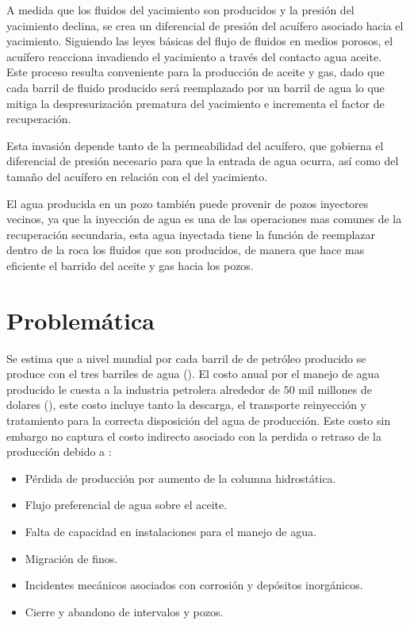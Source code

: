 A medida que los fluidos del yacimiento son producidos y la presión del yacimiento declina, se crea un diferencial de presión del acuífero asociado hacia el yacimiento. Siguiendo las leyes básicas del flujo de fluidos en medios porosos, el acuífero reacciona invadiendo el yacimiento a través del contacto agua aceite. Este proceso resulta conveniente para la producción de aceite y gas, dado que cada barril de fluido producido será reemplazado por un barril de agua lo que mitiga la despresurización prematura del yacimiento e incrementa el factor de recuperación.

Esta invasión depende tanto de la permeabilidad del acuífero, que gobierna el diferencial de presión necesario para que la entrada de agua ocurra, así como del tamaño del acuífero en relación con el del yacimiento.

El agua producida en un pozo también puede provenir de pozos inyectores vecinos, ya que la inyección de agua es una de las operaciones mas comunes de la  recuperación secundaria, esta agua inyectada tiene la función de reemplazar dentro de la roca los fluidos que son producidos, de manera que hace mas eficiente el barrido del aceite y gas hacia los pozos.

\section{Problemática}
Se estima que a nivel mundial por cada barril de de petróleo producido se produce con el tres barriles de agua (\cite{Seright2001}). El costo anual por el manejo de agua producido le cuesta a la industria petrolera alrededor de $50$ mil millones de dolares (\cite{Hill2012}), este costo incluye tanto la descarga, el transporte reinyección y tratamiento para la correcta disposición del agua de producción. Este costo sin embargo no captura el costo indirecto asociado con la perdida o retraso de la producción debido a :

\begin{itemize}
    \item Pérdida de producción por aumento de la columna hidrostática.
    \item Flujo preferencial de agua sobre el aceite.
    \item Falta de capacidad en instalaciones para el manejo de agua.
    \item Migración de finos.
    \item Incidentes mecánicos asociados con corrosión y depósitos inorgánicos.
    \item Cierre y abandono de intervalos y pozos.
\end{itemize}

